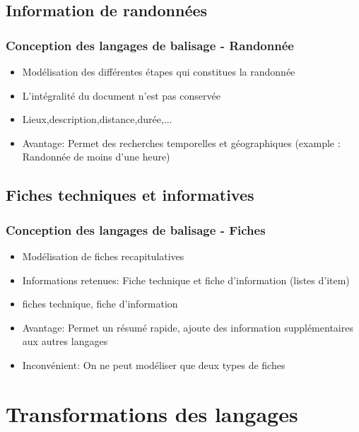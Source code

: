 \documentclass[10pt, compress]{beamer}
\begin{document}
\subsection{Information de randonnées}
\begin{frame}[fragile]
 \frametitle{Conception des langages de balisage - Randonnée}
 \begin{itemize}[<+->]
  [square]
    \item{Modélisation des différentes étapes qui constitues la randonnée}
    \item{L'intégralité du document n'est pas conservée}
    \item{Lieux,description,distance,durée,...}
    \item{Avantage: Permet des recherches temporelles et géographiques (example : Randonnée de moins d'une heure)}
  \end{itemize}
\end{frame}
\subsection{Fiches techniques et informatives}
\begin{frame}[fragile]
 \frametitle{Conception des langages de balisage - Fiches}
 \begin{itemize}[<+->]
  [square]
    \item{Modélisation de fiches recapitulatives}
    \item{Informations retenues: Fiche technique et fiche d'information (listes d'item)}
    \item{fiches technique, fiche d'information}
    \item{Avantage: Permet un résumé rapide, ajoute des information supplémentaires aux autres langages}
    \item{Inconvénient: On ne peut modéliser que deux types de fiches}
  \end{itemize}
\end{frame}
\section{Transformations des langages}
\end{document}
